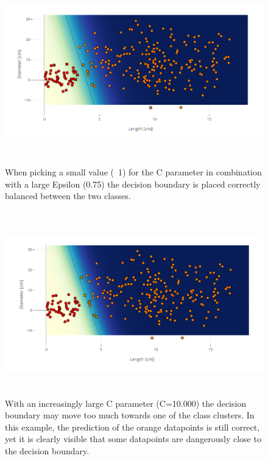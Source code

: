 \documentclass{scrartcl}
\begin{document}
\begin{figure}[h!]%
	\centering
	\includegraphics[height=8cm]{SalmonLin75_1}
	\caption{When picking a small value (~1) for the C parameter in combination with a large Epsilon (0.75) the decision boundary is placed correctly balanced between the two classes.}
	\label{fig:example}%
\end{figure}

\begin{figure}[h!]%
	\centering
	\includegraphics[height=8cm]{SalmonLin75_10k}
	\caption{With an increasingly large C parameter (C=10.000) the decision boundary may move too much towards one of the class clusters. In this example, the prediction of the orange datapoints is still correct, yet it is clearly visible that some datapoints are dangerously close to the decision boundary.}%
	\label{fig:example}%
\end{figure}



\newpage
\end{document}
